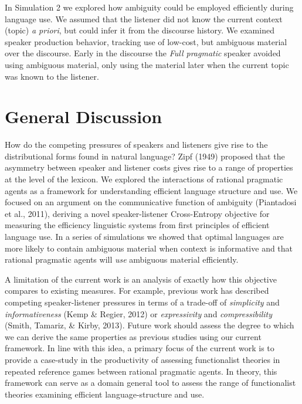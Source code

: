 \documentclass[10pt, letterpaper]{article}
\begin{document}
In Simulation 2 we explored how ambiguity could be employed efficiently
during language use. We assumed that the listener did not know the
current context (topic) \textit{a priori}, but could infer it from the
discourse history. We examined speaker production behavior, tracking use
of low-cost, but ambiguous material over the discourse. Early in the
discourse the \textit{Full pragmatic} speaker avoided using ambiguous
material, only using the material later when the current topic was known
to the listener.

\section{General Discussion}\label{general-discussion}

How do the competing pressures of speakers and listeners give rise to
the distributional forms found in natural language? Zipf (1949) proposed
that the asymmetry between speaker and listener costs gives rise to a
range of properties at the level of the lexicon. We explored the
interactions of rational pragmatic agents as a framework for
understanding efficient language structure and use. We focused on an
argument on the communicative function of ambiguity (Piantadosi et al.,
2011), deriving a novel speaker-listener Cross-Entropy objective for
measuring the efficiency linguistic systems from first principles of
efficient language use. In a series of simulations we showed that
optimal languages are more likely to contain ambiguous material when
context is informative and that rational pragmatic agents will
\emph{use} ambiguous material efficiently.\par

A limitation of the current work is an analysis of exactly how this
objective compares to existing measures. For example, previous work has
described competing speaker-listener pressures in terms of a trade-off
of \textit{simplicity} and \textit{informativeness} (Kemp \& Regier,
2012) or \textit{expressivity} and \textit{compressibility} (Smith,
Tamariz, \& Kirby, 2013). Future work should assess the degree to which
we can derive the same properties as previous studies using our current
framework. In line with this idea, a primary focus of the current work
is to provide a case-study in the productivity of assessing
functionalist theories in repeated reference games between rational
pragmatic agents. In theory, this framework can serve as a domain
general tool to assess the range of functionalist theories examining
efficient language-structure and use.\par
\end{document}
